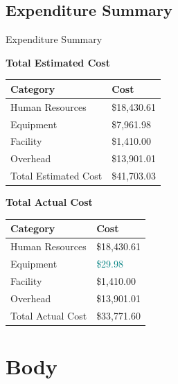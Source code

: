 \documentclass[17pt, aspectratio=169]{beamer}
\begin{document}
\subsection*{Expenditure Summary}
\begin{frame}{Expenditure Summary}
	\begin{center}
		\textbf{Total Estimated Cost}
		\begin{tabular}{||m{}|m{}||}
			\hline
			Category             & Cost        \\
			\hline
			Human Resources      & \$18,430.61 \\
			\hline
			Equipment            & \$7,961.98  \\
			\hline
			Facility             & \$1,410.00  \\
			\hline
			Overhead             & \$13,901.01 \\
			\hline
			Total Estimated Cost & \$41,703.03 \\
			\hline
		\end{tabular}
	\end{center}
\end{frame}
\begin{frame}
	\begin{center}
		\textbf{Total Actual Cost}
		\begin{tabular}{||m{}|m{}||}
			\hline
			Category          & Cost                      \\
			\hline
			Human Resources   & \$18,430.61               \\
			\hline
			Equipment         & \textcolor{teal}{\$29.98} \\
			\hline
			Facility          & \$1,410.00                \\
			\hline
			Overhead          & \$13,901.01               \\
			\hline
			Total Actual Cost & \$33,771.60               \\
			\hline
		\end{tabular}
	\end{center}
\end{frame}
\section{Body}
\end{document}
